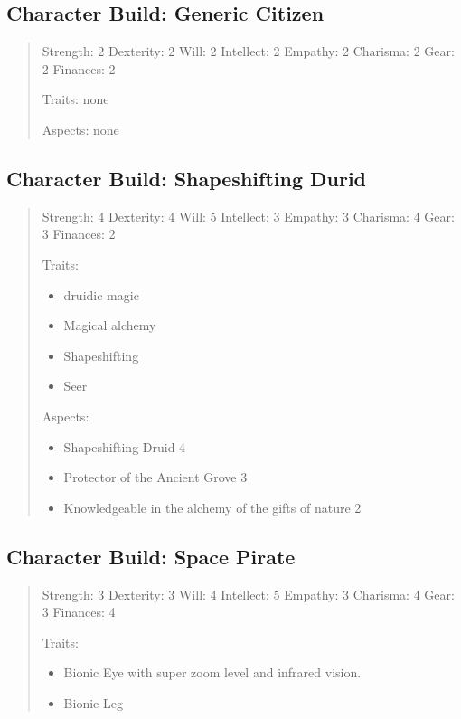 \documentclass[11pt]{article}
\begin{document}
{\subsection{Character Build: Generic Citizen}
\label{sec:org0fca0f2}

\begin{quote}
Strength: 2
Dexterity: 2
Will: 2
Intellect: 2
Empathy: 2
Charisma: 2
Gear: 2
Finances: 2

Traits:
none

Aspects:
none
\end{quote}

\subsection{Character Build: Shapeshifting Durid}
\label{sec:orgce96d7e}

\begin{quote}
Strength: 4
Dexterity: 4
Will: 5
Intellect: 3
Empathy: 3
Charisma: 4
Gear: 3
Finances: 2

Traits:
\begin{itemize}
\item druidic magic
\item Magical alchemy
\item Shapeshifting
\item Seer
\end{itemize}

Aspects:
\begin{itemize}
\item Shapeshifting Druid 4
\item Protector of the Ancient Grove 3
\item Knowledgeable in the alchemy of the gifts of nature 2
\end{itemize}
\end{quote}

\subsection{Character Build: Space Pirate}
\label{sec:org44032c9}

\begin{quote}
Strength: 3
Dexterity: 3
Will: 4
Intellect: 5
Empathy: 3
Charisma: 4
Gear: 3
Finances: 4

Traits:
\begin{itemize}
\item Bionic Eye with super zoom level and infrared vision.
\item Bionic Leg
\end{itemize}


\end{quote}}
\end{document}
